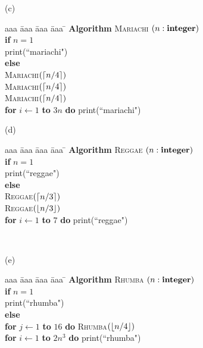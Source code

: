 \documentclass[11pt]{article}
\begin{document}
\begin{problem}
\bigskip
\noindent
(c)\ \
\begin{minipage}[t]{3in}
\begin{tabbing}
aaa \= aaa \= aaa \= aaa \=  \kill
\textbf{Algorithm} \textsc{Mariachi} $(n: \mbox{\bf integer})$ \\
          \> \textbf{if} $n = 1$ \\
          \>\>  print(``mariachi") \\
          \>\textbf{else} \\
          \>\>  \textsc{Mariachi}$({\left\lceil n/4\right\rceil})$\\
          \>\>  \textsc{Mariachi}$({\left\lceil n/4\right\rceil})$\\
          \>\>  \textsc{Mariachi}$({\left\lceil n/4\right\rceil})$\\
      \>\> \textbf{for} $i \leftarrow 1$ \textbf{to} $3n$ \textbf{do} print(``mariachi")
\end{tabbing}
\end{minipage}

\bigskip
\noindent
(d)\ \
\begin{minipage}[t]{3in}
\begin{tabbing}
aaa \= aaa \= aaa \= aaa \=  \kill
\textbf{Algorithm} \textsc{Reggae} $(n: \mbox{\bf integer})$ \\
          \> \textbf{if} $n = 1$ \\
          \>\>  print(``reggae") \\
          \>\textbf{else} \\
          \>\>  \textsc{Reggae}$({\left\lceil n/3\right\rceil})$\\
          \>\>  \textsc{Reggae}$({\left\lfloor n/3\right\rfloor})$\\
      \>\> \textbf{for} $i \leftarrow 1$ \textbf{to} $7$ \textbf{do} print(``reggae")
\end{tabbing}
\end{minipage}
\bigskip
\


\bigskip
\noindent
(e)\ \
\begin{minipage}[t]{3in}
\begin{tabbing}
aaa \= aaa \= aaa \= aaa \=  \kill
\textbf{Algorithm} \textsc{Rhumba} $(n: \mbox{\bf integer})$ \\
          \> \textbf{if} $n = 1$ \\
          \>\>  print(``rhumba") \\
          \>\textbf{else} \\
          \>\>  \textbf{for} $j \leftarrow 1$ \textbf{to} $16$
					\textbf{do} \textsc{Rhumba}$({\left\lfloor n/4\right\rfloor})$\\
      \>\> \textbf{for} $i \leftarrow 1$ \textbf{to} $2n^3$ \textbf{do} print(``rhumba")
\end{tabbing}
\end{minipage}
\bigskip
\


\end{problem}
\end{document}
